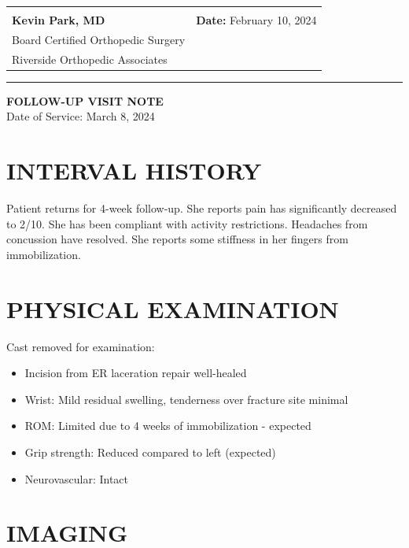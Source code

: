 \documentclass[11pt]{article}
\begin{document}
\vspace{2em}

\begin{tabular}{@{}p{7cm}p{7cm}@{}}
\hrulefill & \\
\textbf{Kevin Park, MD} & \textbf{Date:} February 10, 2024 \\
Board Certified Orthopedic Surgery & \\
Riverside Orthopedic Associates & \\
\end{tabular}

\vspace{3em}
\hrule
\vspace{1em}

\begin{center}
{\Large\bfseries FOLLOW-UP VISIT NOTE}\\
{\normalsize Date of Service: March 8, 2024}
\end{center}

\vspace{1em}

\section*{INTERVAL HISTORY}

Patient returns for 4-week follow-up. She reports pain has significantly decreased to 2/10. She has been compliant with activity restrictions. Headaches from concussion have resolved. She reports some stiffness in her fingers from immobilization.

\section*{PHYSICAL EXAMINATION}

Cast removed for examination:
\begin{itemize}[nosep]
\item Incision from ER laceration repair well-healed
\item Wrist: Mild residual swelling, tenderness over fracture site minimal
\item ROM: Limited due to 4 weeks of immobilization - expected
\item Grip strength: Reduced compared to left (expected)
\item Neurovascular: Intact
\end{itemize}

\section*{IMAGING}
\end{document}
